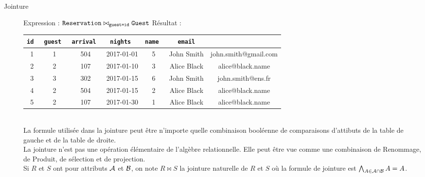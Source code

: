 \documentclass{cours}
\begin{document}
\begin{description}
    \item[Jointure] Expression : $\texttt{Reservation} \bowtie_{\texttt{guest=id}} \texttt{Guest}$
    Résultat : \\
    \begin{tabular}{ccccccc}
        \toprule
        \tt id & \tt guest & \tt arrival & \tt nights & \tt name & \tt email\\
        \midrule
        1 & 1 & 504 & 2017-01-01 & 5 & John Smith & john.smith@gmail.com\\
        2 & 2 & 107 & 2017-01-10 & 3 & Alice Black & alice@black.name\\
        3 & 3 & 302 & 2017-01-15 & 6 & John Smith & john.smith@ens.fr\\
        4 & 2 & 504 & 2017-01-15 & 2 & Alice Black & alice@black.name\\
        5 & 2 & 107 & 2017-01-30 & 1 & Alice Black & alice@black.name\\
        \bottomrule
    \end{tabular}\\
    La formule utilisée dans la jointure peut être n'importe quelle combinaison booléenne de comparaisons d'attibuts de la table de gauche et de la table de droite. \\
    La jointure n'est pas une opération élémentaire de l'algèbre relationnelle. Elle peut être vue comme une combinaison de Renommage, de Produit, de sélection et de projection.\\
    Si $R$ et $S$ ont pour attributs $\mathcal{A}$ et $\mathcal{B}$, on note $R \bowtie S$ la jointure naturelle de $R$ et $S$ où la formule de jointure est $\bigwedge_{A \in \mathcal{A} \cap \mathcal{B}} A = A$.
\end{description}
\end{document}
